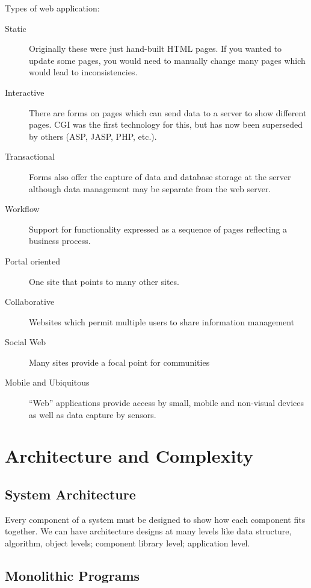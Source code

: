 Types of web application:
\begin{description}
    \item[Static] Originally these were just hand-built HTML pages.
        If you wanted to update some pages, you would need to manually change many pages which would lead to inconsistencies.
    \item[Interactive] There are forms on pages which can send data to a server to show different pages.
        CGI was the first technology for this, but has now been superseded by others (ASP, JASP, PHP, etc.).
    \item[Transactional] Forms also offer the capture of data and database storage at the server although data management may be separate from the web server.
    \item[Workflow] Support for functionality expressed as a sequence of pages reflecting a business process.
    \item[Portal oriented] One site that points to many other sites.
    \item[Collaborative] Websites which permit multiple users to share information management
    \item[Social Web] Many sites provide a focal point for communities
    \item[Mobile and Ubiquitous] ``Web'' applications provide access by small, mobile and non-visual devices as well as data capture by sensors.
\end{description}

\section{Architecture and Complexity}\label{sec:architecture_and_complexity}

\subsection{System Architecture}\label{sub:system_architecure}

Every component of a system must be designed to show how each component fits together.
We can have architecture designs at many levels like data structure, algorithm, object levels; component library level; application level.

\subsection{Monolithic Programs}\label{sub:monolithic_programs}


